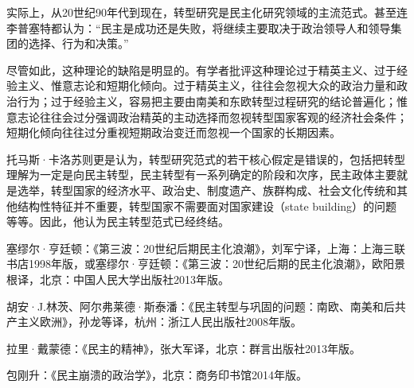 实际上，从20世纪90年代到现在，转型研究是民主化研究领域的主流范式。甚至连李普塞特都认为：“民主是成功还是失败，将继续主要取决于政治领导人和领导集团的选择、行为和决策。”

尽管如此，这种理论的缺陷是明显的。有学者批评这种理论过于精英主义、过于经验主义、惟意志论和短期化倾向。过于精英主义，往往会忽视大众的政治力量和政治行为；过于经验主义，容易把主要由南美和东欧转型过程研究的结论普遍化；惟意志论往往会过分强调政治精英的主动选择而忽视转型国家客观的经济社会条件；短期化倾向往往过分重视短期政治变迁而忽视一个国家的长期因素。

托马斯·卡洛苏则更是认为，转型研究范式的若干核心假定是错误的，包括把转型理解为一定是向民主转型，民主转型有一系列确定的阶段和次序，民主政体主要就是选举，转型国家的经济水平、政治史、制度遗产、族群构成、社会文化传统和其他结构性特征并不重要，转型国家不需要面对国家建设（state building）的问题等等。因此，他认为民主转型范式已经终结。


塞缪尔·亨廷顿：《第三波：20世纪后期民主化浪潮》，刘军宁译，上海：上海三联书店1998年版，或塞缪尔·亨廷顿：《第三波：20世纪后期的民主化浪潮》，欧阳景根译，北京：中国人民大学出版社2013年版。

胡安·J.林茨、阿尔弗莱德·斯泰潘：《民主转型与巩固的问题：南欧、南美和后共产主义欧洲》，孙龙等译，杭州：浙江人民出版社2008年版。

拉里·戴蒙德：《民主的精神》，张大军译，北京：群言出版社2013年版。

包刚升：《民主崩溃的政治学》，北京：商务印书馆2014年版。

